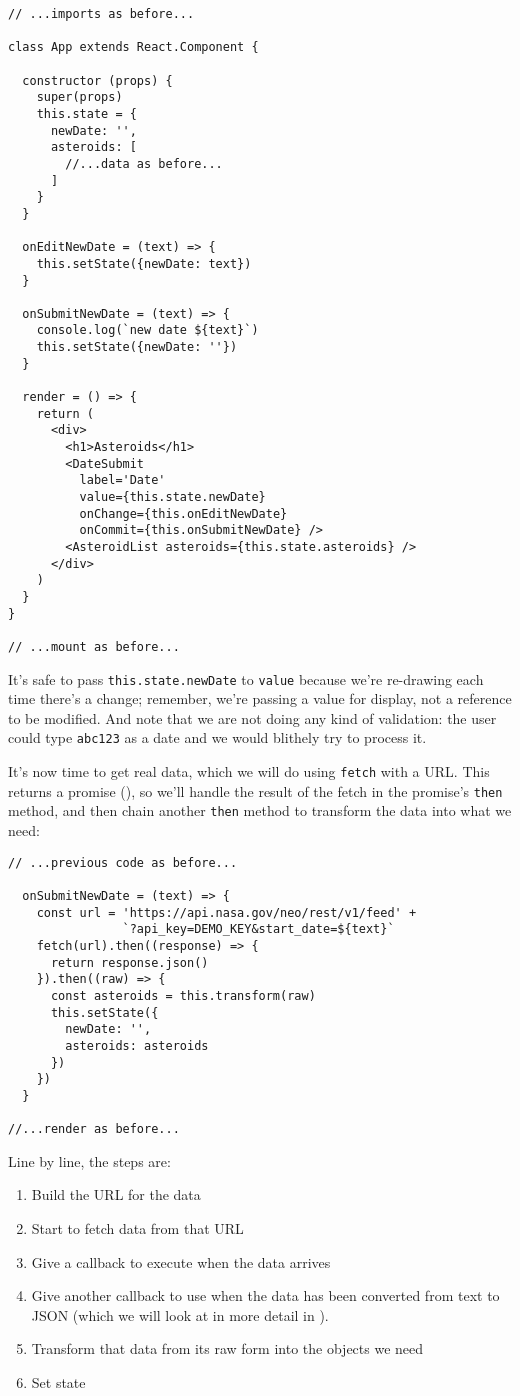 \begin{verbatim}
// ...imports as before...

class App extends React.Component {

  constructor (props) {
    super(props)
    this.state = {
      newDate: '',
      asteroids: [
        //...data as before...
      ]
    }
  }

  onEditNewDate = (text) => {
    this.setState({newDate: text})
  }

  onSubmitNewDate = (text) => {
    console.log(`new date ${text}`)
    this.setState({newDate: ''})
  }

  render = () => {
    return (
      <div>
        <h1>Asteroids</h1>
        <DateSubmit
          label='Date'
          value={this.state.newDate}
          onChange={this.onEditNewDate}
          onCommit={this.onSubmitNewDate} />
        <AsteroidList asteroids={this.state.asteroids} />
      </div>
    )
  }
}

// ...mount as before...
\end{verbatim}

It's safe to pass \texttt{this.state.newDate} to \texttt{value}
because we're re-drawing each time there's a change;
remember, we're passing a value for display,
not a reference to be modified.
And note that we are not doing any kind of validation:
the user could type \texttt{abc123} as a date
and we would blithely try to process it.

It's now time to get real data,
which we will do using \texttt{fetch} with a URL.
This returns a promise (),
so we'll handle the result of the fetch in the promise's \texttt{then} method,
and then chain another \texttt{then} method to transform the data into what we need:

\begin{verbatim}
// ...previous code as before...

  onSubmitNewDate = (text) => {
    const url = 'https://api.nasa.gov/neo/rest/v1/feed' +
                `?api_key=DEMO_KEY&start_date=${text}`
    fetch(url).then((response) => {
      return response.json()
    }).then((raw) => {
      const asteroids = this.transform(raw)
      this.setState({
        newDate: '',
        asteroids: asteroids
      })
    })
  }

//...render as before...
\end{verbatim}

Line by line,
the steps are:

\begin{enumerate}
\item
  Build the URL for the data
\item
  Start to fetch data from that URL
\item
  Give a callback to execute when the data arrives
\item
  Give another callback to use when the data has been converted from text to JSON
  (which we will look at in more detail in ).
\item
  Transform that data from its raw form into the objects we need
\item
  Set state
\end{enumerate}

